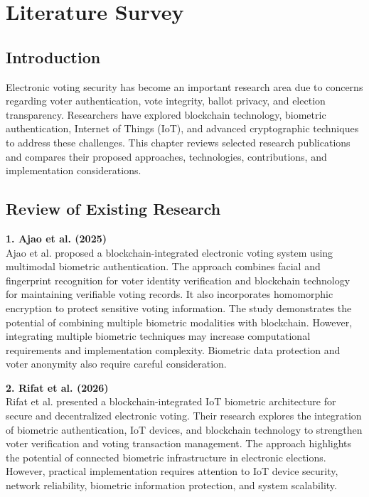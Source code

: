 \documentclass[12pt]{report}
\begin{document}
	
	\chapter{Literature Survey}
	
	\section{Introduction}
	Electronic voting security has become an important research area due to concerns regarding voter authentication, vote integrity, ballot privacy, and election transparency. Researchers have explored blockchain technology, biometric authentication, Internet of Things (IoT), and advanced cryptographic techniques to address these challenges. This chapter reviews selected research publications and compares their proposed approaches, technologies, contributions, and implementation considerations.
	
	\section{Review of Existing Research}
	
	\noindent\textbf{1. Ajao et al. (2025)}\\
	Ajao et al. proposed a blockchain-integrated electronic voting system using multimodal biometric authentication. The approach combines facial and fingerprint recognition for voter identity verification and blockchain technology for maintaining verifiable voting records. It also incorporates homomorphic encryption to protect sensitive voting information. The study demonstrates the potential of combining multiple biometric modalities with blockchain. However, integrating multiple biometric techniques may increase computational requirements and implementation complexity. Biometric data protection and voter anonymity also require careful consideration.
	
	\vspace{0.3cm}
	\noindent\textbf{2. Rifat et al. (2026)}\\
	Rifat et al. presented a blockchain-integrated IoT biometric architecture for secure and decentralized electronic voting. Their research explores the integration of biometric authentication, IoT devices, and blockchain technology to strengthen voter verification and voting transaction management. The approach highlights the potential of connected biometric infrastructure in electronic elections. However, practical implementation requires attention to IoT device security, network reliability, biometric information protection, and system scalability.
	
\end{document}
